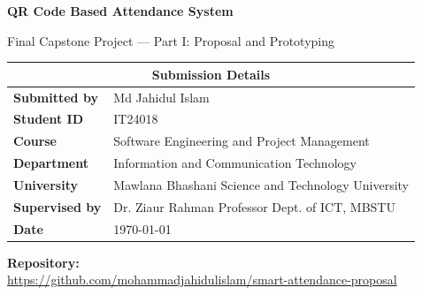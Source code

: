 \documentclass[11pt,a4paper]{article}
\title{\proj}
\author{Md Jahidul Islam}
\date{\today}
\renewcommand{\arraystretch}{1.35}
\newcommand{\proj}{QR Code Based Attendance System}
\begin{document}
\begin{titlepage}
\centering
\vspace*{1.5cm}
{\LARGE\bfseries \proj\par}
\vspace{0.4cm}
{\large Final Capstone Project --- Part I: Proposal and Prototyping\par}
\vspace{1.5cm}

{\renewcommand{\arraystretch}{1.6}
\begin{tabular}{|p{4.2cm}|p{9cm}|}
\hline
\multicolumn{2}{|c|}{\textbf{Submission Details}}\\
\hline
\textbf{Submitted by} & Md Jahidul Islam\\ \hline
\textbf{Student ID} & IT24018\\ \hline
\textbf{Course} & Software Engineering and Project Management\\ \hline
\textbf{Department} & Information and Communication Technology\\ \hline
\textbf{University} & Mawlana Bhashani Science and Technology University\\ \hline
\textbf{Supervised by} & Dr. Ziaur Rahman\newline
Professor\newline
Dept. of ICT, MBSTU\\ \hline
\textbf{Date} & \today\\
\hline
\end{tabular}}

\vspace{1.5cm}
\textbf{Repository:}\\
\url{https://github.com/mohammadjahidulislam/smart-attendance-proposal}
\vfill
\end{titlepage}

\begin{abstract}
Manual and paper-based attendance in universities is slow, error-prone and hard to report on.
This proposal describes the \proj{}, a role-based system in which teachers open class sessions,
students check in, leave requests are submitted and approved online, and administrators receive
course-wise attendance reports. The system automatically warns students whose attendance falls
below a configurable threshold (default 75\%). The proposal covers the problem, scope,
requirements, risks, technology stack, budget, a Scrum-based schedule with a Gantt chart,
six UML diagrams, and a prototype built from five classes of the class diagram.
\end{abstract}
\end{document}
